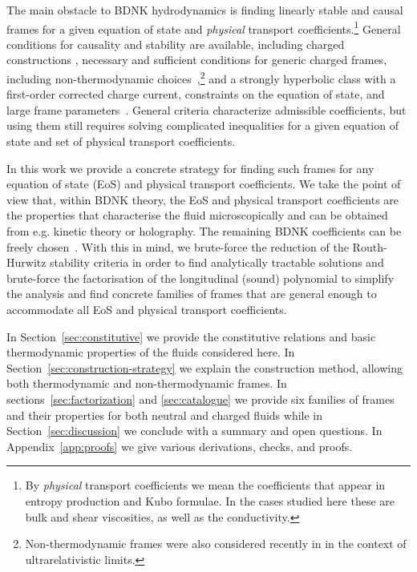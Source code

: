 The main obstacle to BDNK hydrodynamics is finding linearly stable and causal
frames for a given equation of state and \emph{physical} transport coefficients.\footnote{By \emph{physical} transport coefficients we mean the coefficients that appear in entropy production and Kubo formulae. In the cases studied here these are bulk and shear viscosities, as well as the conductivity.} General conditions for
causality and stability are available, including charged constructions
\cite{HoultKovtun,BDN2022}, necessary and sufficient conditions for generic
charged frames, including non-thermodynamic choices~\cite{AbboudSperanzaNoronha},\footnote{Non-thermodynamic frames were also considered recently in \cite{Armas:2025uyv, Armas:2026mul} in the context of ultrarelativistic limits.} and a strongly hyperbolic class
with a first-order corrected charge current, constraints on the equation of state, and large frame parameters~\cite{SchianchiAbalos}.
General criteria characterize admissible coefficients, but using them still
requires solving complicated inequalities for a given equation of state and set of
physical transport coefficients. 

In this work we provide a concrete strategy for finding such frames for any equation of state (EoS) and 
physical transport coefficients. We take the point of view that, within BDNK theory, the EoS and physical transport coefficients are
the properties that characterise the fluid microscopically and can be obtained from e.g. kinetic theory or holography.
The remaining BDNK coefficients can be freely
chosen~\cite{HoultKovtunMicroscopic}. With this in mind, we brute-force
the reduction of the Routh-Hurwitz stability criteria in order to find
analytically tractable solutions and brute-force the factorisation of
the longitudinal (sound) polynomial to simplify the analysis and find
concrete families of frames that are general enough to accommodate
all EoS and physical transport coefficients.

In Section~\ref{sec:constitutive} we provide the constitutive relations and basic thermodynamic properties of the fluids considered here. In Section~\ref{sec:construction-strategy}
we explain the construction method, allowing both thermodynamic and non-thermodynamic frames.  In sections~\ref{sec:factorization} and
\ref{sec:catalogue} we provide six families of frames and their properties for both neutral and charged fluids while in Section~\ref{sec:discussion} we conclude with a summary and open questions. In
Appendix~\ref{app:proofs} we give various derivations, checks, and proofs.

